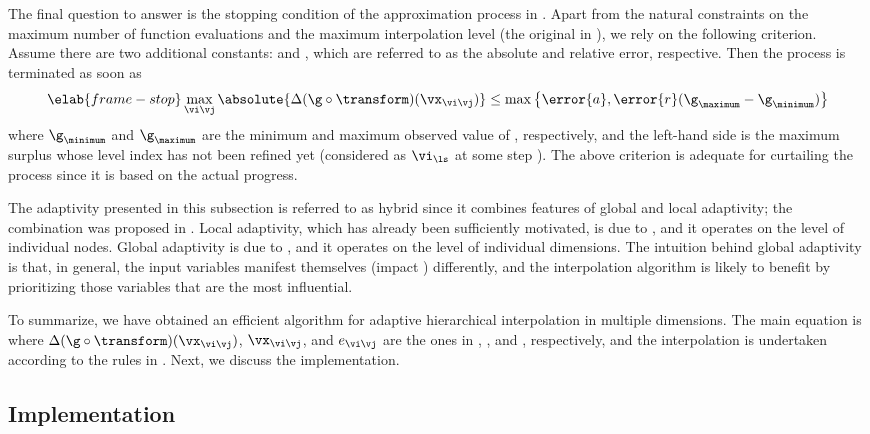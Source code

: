 The final question to answer is the stopping condition of the approximation
process in . Apart from the natural constraints on the
maximum number of function evaluations and the maximum interpolation level (the
original \ls in ), we rely on the following
criterion. Assume there are two additional constants:  and ,
which are referred to as the absolute and relative error, respective. Then the
process is terminated as soon as
\begin{equation} \elab{frame-stop}
  \max_{\vi \vj} \absolute{\Delta(\g \circ \transform)(\vx_{\vi \vj})} \leq \max \left\{ \error{a}, \error{r} (\g_\maximum - \g_\minimum) \right\}
\end{equation}
where $\g_\minimum$ and $\g_\maximum$ are the minimum and maximum observed value
of \g, respectively, and the left-hand side is the maximum surplus whose level
index has not been refined yet (considered as $\vi_{\ls}$ at some step \ls). The
above criterion is adequate for curtailing the process since it is based on the
actual progress.

The adaptivity presented in this subsection is referred to as hybrid since it
combines features of global and local adaptivity; the combination was proposed
in \cite{jakeman2012}. Local adaptivity, which has already been sufficiently
motivated, is due to \cite{ma2009}, and it operates on the level of individual
nodes. Global adaptivity is due to \cite{klimke2006}, and it operates on the
level of individual dimensions. The intuition behind global adaptivity is that,
in general, the input variables manifest themselves (impact \g) differently, and
the interpolation algorithm is likely to benefit by prioritizing those variables
that are the most influential.

\conclusioncut
To summarize, we have obtained an efficient algorithm for adaptive hierarchical
interpolation in multiple dimensions. The main equation is 
where $\Delta(\g \circ \transform)(\vx_{\vi \vj})$, $\vx_{\vi \vj}$, and $e_{\vi
\vj}$ are the ones in , , and
, respectively, and the interpolation is undertaken according
to the rules in . Next, we discuss the implementation.

\subsection{Implementation}

